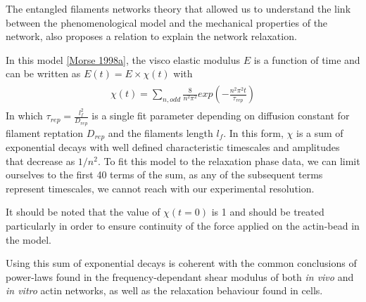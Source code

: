 \documentclass[A4paperpaper,11pt,english]{sphinxmanual}
\begin{document}
The entangled filaments networks theory that allowed us to understand the link between the phenomenological
model and the mechanical properties of the network, also proposes a relation to
explain the network relaxation.

In this model {\hyperref[index-latex:morse1998a]{{[}Morse  1998a{]}}}, the visco elastic modulus  \(E\) is a function of time
and can be written as \(E(t) = E\times \chi(t)\) with
\label{index-latex:equation-chi}\begin{gather}
\begin{split}\chi(t)=\sum_{n, odd} \frac{8}{n^2 \pi^2}exp\left(- \frac{n^2\pi^2 t}{ \tau_{rep}} \right)\end{split}\label{index-latex-chi}
\end{gather}
In which \(\tau_{rep} = \frac{l_f^2}{D_{rep}}\) is a single fit parameter
depending on diffusion constant for filament reptation \(D_{rep}\) and the
filaments length \(l_f\). In this form, \(\chi\) is a sum of
exponential decays with well defined characteristic timescales and amplitudes
that decrease as \(1/n^2\). To fit this model to the
relaxation phase data, we can limit ourselves to the first 40 terms of the sum, as
any of the subsequent terms represent timescales, we cannot reach with our
experimental resolution.

It should be noted that the value of \(\chi(t=0)\) is 1 and should be
treated particularly in order to ensure continuity of the force applied on the
actin-bead in the model.

Using this sum of exponential decays is coherent with the common conclusions of
power-laws found in the frequency-dependant shear modulus of both \emph{in vivo} and \emph{in vitro} actin
networks, as well as the relaxation behaviour found in cells.
\end{document}
